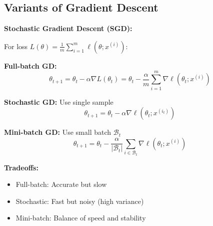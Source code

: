 \subsection{Variants of Gradient Descent}

\begin{seanbox}{6.6}
\textbf{Stochastic Gradient Descent (SGD):}

For loss $L(\theta) = \frac{1}{m} \sum_{i=1}^m \ell(\theta; x^{(i)})$:

\textbf{Full-batch GD:}
\begin{equation}
    \theta_{t+1} = \theta_t - \alpha \nabla L(\theta_t) = \theta_t - \frac{\alpha}{m} \sum_{i=1}^m \nabla \ell(\theta_t; x^{(i)})
\end{equation}

\textbf{Stochastic GD:} Use single sample
\begin{equation}
    \theta_{t+1} = \theta_t - \alpha \nabla \ell(\theta_t; x^{(i_t)})
\end{equation}

\textbf{Mini-batch GD:} Use small batch $\mathcal{B}_t$
\begin{equation}
    \theta_{t+1} = \theta_t - \frac{\alpha}{|\mathcal{B}_t|} \sum_{i \in \mathcal{B}_t} \nabla \ell(\theta_t; x^{(i)})
\end{equation}

\textbf{Tradeoffs:}
\begin{itemize}
    \item Full-batch: Accurate but slow
    \item Stochastic: Fast but noisy (high variance)
    \item Mini-batch: Balance of speed and stability
\end{itemize}
\end{seanbox}


